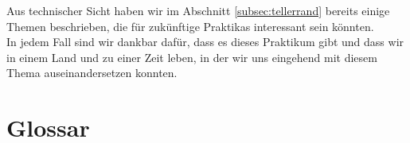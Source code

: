 Aus technischer Sicht haben wir im Abschnitt \ref{subsec:tellerrand} bereits einige Themen beschrieben, die für zukünftige Praktikas interessant sein könnten. \\

In jedem Fall sind wir dankbar dafür, dass es dieses Praktikum gibt und dass wir in einem Land und zu einer Zeit leben, in der wir uns eingehend mit diesem Thema auseinandersetzen konnten.


\newpage

\section{Glossar}
